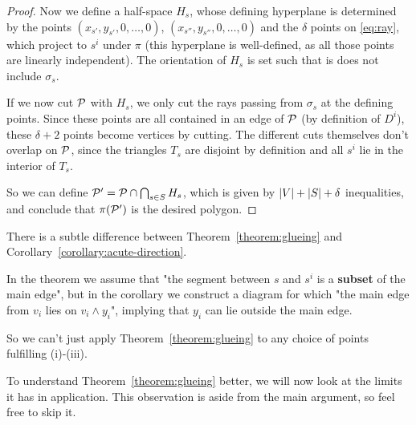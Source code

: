 \begin{proof}
  Now we define a half-space $H_s$, whose defining hyperplane is determined by the points $(x_{s'},y_{s'},0,\dots,0)$, $(x_{s''},y_{s''},0,\dots,0)$ and the $\delta$ points on \eqref{eq:ray}, which project to $s^i$ under $\pi$ (this hyperplane is well-defined, as all those points are linearly independent). The orientation of $H_s$ is set such that is does not include $\sigma_s$.

  If we now cut $\P$ with $H_s$, we only cut the rays passing from $\sigma_s$ at the defining points. Since these points are all contained in an edge of $\P$ (by definition of $D^i$), these $\delta + 2$ points become vertices by cutting. The different cuts themselves don't overlap on $\P$, since the triangles $T_s$ are disjoint by definition and all $s^i$ lie in the interior of $T_s$.

  So we can define $\P' = \P \cap \bigcap_{s \in S} H_s$, which is given by $\abs{V}+\abs{S}+\delta$ inequalities, and conclude that $\pi(\P')$ is the desired polygon.
\end{proof}

\begin{remark}\label{remark:pitfall}
  There is a subtle difference between Theorem~\ref{theorem:glueing} and Corollary~\ref{corollary:acute-direction}.

  In the theorem we assume that "the segment between $s$ and $s^i$ is a \textbf{subset} of the main edge", but in the corollary we construct a diagram for which "the main edge from $v_i$ lies on $v_i \wedge y_i$", implying that $y_i$ can lie outside the main edge. 

  So we can't just apply Theorem~\ref{theorem:glueing} to any choice of points fulfilling (i)-(iii).
\end{remark}

To understand Theorem~\ref{theorem:glueing} better, we will now look at the limits it has in application. This observation is aside from the main argument, so feel free to skip it.

